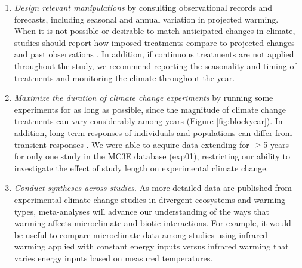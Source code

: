 \documentclass{article}
\begin{document}
\begin{enumerate}
\item\textit{Design relevant manipulations} by consulting observational records and forecasts, including seasonal and annual variation in projected warming. When it is not possible or desirable to match anticipated changes in climate, studies should report how imposed treatments compare to projected changes and past observations \citep[e.g.,][]{hoover2014, zhu2016}. In addition, if continuous treatments are not applied throughout the study, we recommend reporting the seasonality and timing of treatments and monitoring the climate throughout the year.

\item\textit{Maximize the duration of climate change experiments} by running some experiments for as long as possible, since the magnitude of climate change treatments can vary considerably among years (Figure \ref{fig:blockyear}). In addition, long-term responses of individuals and populations can differ from transient responses \citep{saleska2002,franklin1989,giasson2013,harte2015}. We were able to acquire data extending for $\geq$5 years for only one study in the MC3E database (exp01), restricting our ability to investigate the effect of study length on experimental climate change. %
\item\textit{Conduct syntheses across studies}. As more detailed data are published from experimental climate change studies in divergent ecosystems and warming types, meta-analyses will advance our understanding of the ways that warming affects microclimate and biotic interactions. For example, it would be useful to compare microclimate data among studies using infrared warming applied with constant energy inputs versus infrared warming that varies energy inputs based on measured temperatures. 

\end{enumerate}


\clearpage
\end{document}

